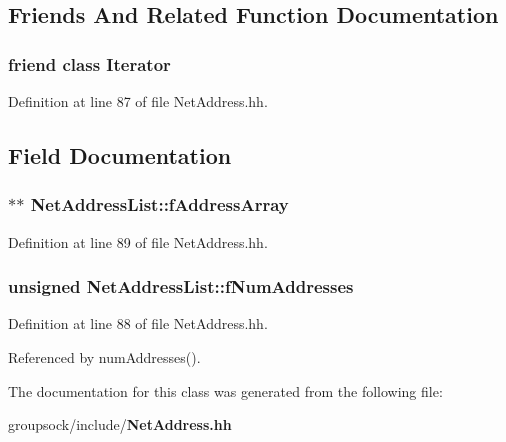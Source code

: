 \subsection{Friends And Related Function Documentation}
\subsubsection[{Iterator}]{\setlength{\rightskip}{0pt plus 5cm}friend class {\bf Iterator}\hspace{0.3cm}{\ttfamily [friend]}}\label{classNetAddressList_a9830fc407400559db7e7783cc10a9394}


Definition at line 87 of file Net\+Address.\+hh.



\subsection{Field Documentation}
\subsubsection[{f\+Address\+Array}]{$\ast$$\ast$ Net\+Address\+List\+::f\+Address\+Array\hspace{0.3cm}{\ttfamily [private]}}\label{classNetAddressList_a9ef45f704929570fcbab0d849efa3d98}


Definition at line 89 of file Net\+Address.\+hh.

\subsubsection[{f\+Num\+Addresses}]{\setlength{\rightskip}{0pt plus 5cm}unsigned Net\+Address\+List\+::f\+Num\+Addresses\hspace{0.3cm}{\ttfamily [private]}}\label{classNetAddressList_a24edfb5ff9bd0cf6a9ffb8f6ea5cdd9c}


Definition at line 88 of file Net\+Address.\+hh.



Referenced by num\+Addresses().



The documentation for this class was generated from the following file\+:\begin{DoxyCompactItemize}
\item 
groupsock/include/{\bf Net\+Address.\+hh}\end{DoxyCompactItemize}
